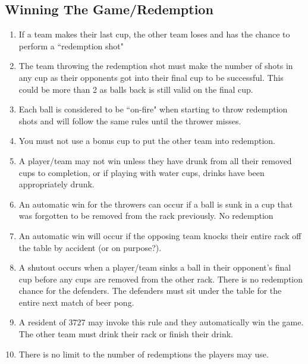 	\subsection{Winning The Game/Redemption}\label{ssec:Winning}
        \begin{enumerate}[label=(\roman*), ref=\roman*]
            \item \label{itm:Winning,lastcup} If a team makes their last cup, the other team loses and has the chance to perform a ``redemption shot"
            \item \label{itm:Winning,redemption} The team throwing the redemption shot must make the number of shots in any cup as their opponents got into their final cup to be successful.
                This could be more than 2 as balls back is still valid on the final cup.
            \item \label{itm:Winning,onfire} Each ball is considered to be ``on-fire" when starting to throw redemption shots and will follow the same rules until the thrower misses.
            \item \label{itm:Winning,specialshot} You must not use a bonus cup to put the other team into redemption.
            \item \label{itm:Winning,drinking} A player/team may not win unless they have drunk from all their removed cups to completion, or if playing with water cups, drinks have been appropriately drunk. 
            \item \label{itm:Winning,death/killcups} An automatic win for the throwers can occur if a ball is sunk in a cup that was forgotten to be removed from the rack previously.
                No redemption
            \item \label{itm:Winning,knockovers} An automatic win will occur if the opposing team knocks their entire rack off the table by accident (or on purpose?).
            \item \label{itm:Winning,shutout} A shutout occurs when a player/team sinks a ball in their opponent's final cup before any cups are removed from the other rack.
                There is no redemption chance for the defenders.
                The defenders must sit under the table for the entire next match of beer pong.
            \item \label{itm:ResidentWins} A resident of 3727 may invoke this rule and they automatically win the game.
                The other team must drink their rack or finish their drink.
            \item \label{itm:Winning,no.Redemtions} There is no limit to the number of redemptions the players may use.
        \end{enumerate}
